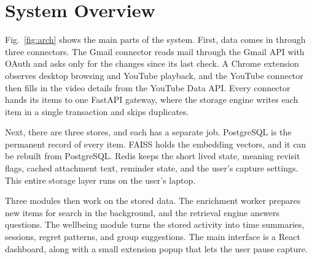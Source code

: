 \documentclass[conference]{IEEEtran}
\begin{document}
\section{System Overview}\label{sec:overview}
Fig.~\ref{fig:arch} shows the main parts of the system. First, data comes in through three connectors. The Gmail connector reads mail through the Gmail API with OAuth and asks only for the changes since its last check. A Chrome extension observes desktop browsing and YouTube playback, and the YouTube connector then fills in the video details from the YouTube Data API. Every connector hands its items to one FastAPI gateway, where the storage engine writes each item in a single transaction and skips duplicates.

Next, there are three stores, and each has a separate job. PostgreSQL is the permanent record of every item. FAISS holds the embedding vectors, and it can be rebuilt from PostgreSQL. Redis keeps the short lived state, meaning revisit flags, cached attachment text, reminder state, and the user's capture settings. This entire storage layer runs on the user's laptop.

Three modules then work on the stored data. The enrichment worker prepares new items for search in the background, and the retrieval engine answers questions. The wellbeing module turns the stored activity into time summaries, sessions, regret patterns, and group suggestions. The main interface is a React dashboard, along with a small extension popup that lets the user pause capture.
\end{document}
